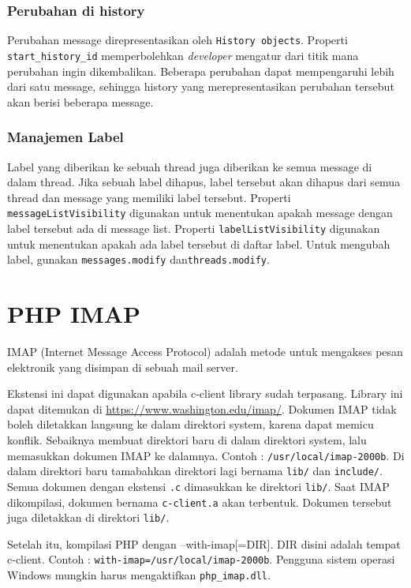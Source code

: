 \subsubsection{Perubahan di history}
Perubahan message direpresentasikan oleh \texttt{History objects}. Properti \texttt{start\_history\_id} memperbolehkan \textit{developer} mengatur dari titik mana perubahan ingin dikembalikan. Beberapa perubahan dapat mempengaruhi lebih dari satu message, sehingga history yang merepresentasikan perubahan tersebut akan berisi beberapa message.

\subsubsection{Manajemen Label}
Label yang diberikan ke sebuah thread juga diberikan ke semua message di dalam thread. Jika sebuah label dihapus, label tersebut akan dihapus dari semua thread dan message yang memiliki label tersebut. Properti \texttt{messageListVisibility} digunakan untuk menentukan apakah message dengan label tersebut ada di message list. Properti \texttt{labelListVisibility} digunakan untuk menentukan apakah ada label tersebut di daftar label. Untuk mengubah label, gunakan \texttt{messages.modify} dan\texttt{threads.modify}.

\section{PHP IMAP ~\cite{php-imap}}
\label{sec:PHPIMAP}
IMAP (Internet Message Access Protocol) adalah metode untuk mengakses pesan elektronik yang disimpan di sebuah mail server.

Ekstensi ini dapat digunakan apabila c-client library sudah terpasang. Library ini dapat ditemukan di \url{https://www.washington.edu/imap/}. Dokumen IMAP tidak boleh diletakkan langsung ke dalam direktori system, karena dapat memicu konflik. Sebaiknya membuat direktori baru di dalam direktori system, lalu memasukkan dokumen IMAP ke dalamnya. Contoh : \texttt{/usr/local/imap-2000b}. Di dalam direktori baru tamabahkan direktori lagi bernama \texttt{lib/} dan \texttt{include/}. Semua dokumen dengan ekstensi \texttt{.c} dimasukkan ke direktori \texttt{lib/}. Saat IMAP dikompilasi, dokumen bernama \texttt{c-client.a} akan terbentuk. Dokumen tersebut juga diletakkan di direktori \texttt{lib/}.

Setelah itu, kompilasi PHP dengan --with-imap[=DIR]. DIR disini adalah tempat c-client. Contoh : \texttt{with-imap=/usr/local/imap-2000b}. Pengguna sistem operasi Windows mungkin harus mengaktifkan \texttt{php\_imap.dll}.

